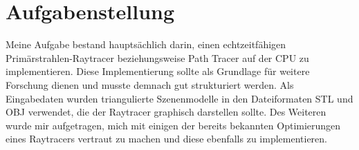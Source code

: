 \documentclass[crop=false]{standalone}
\begin{document}
  \section{Aufgabenstellung} %
  \label{sec:aufgabenstellung}
    Meine Aufgabe bestand hauptsächlich darin, einen echtzeitfähigen Primärstrahlen-Raytracer beziehungsweise Path Tracer auf der CPU zu implementieren.
    Diese Implementierung sollte als Grundlage für weitere Forschung dienen und musste demnach gut strukturiert werden.
    Als Eingabedaten wurden triangulierte Szenenmodelle in den Dateiformaten STL und OBJ verwendet, die der Raytracer graphisch darstellen sollte.
    Des Weiteren wurde mir aufgetragen, mich mit einigen der bereits bekannten Optimierungen eines Raytracers vertraut zu machen und diese ebenfalls zu implementieren.
\end{document}
